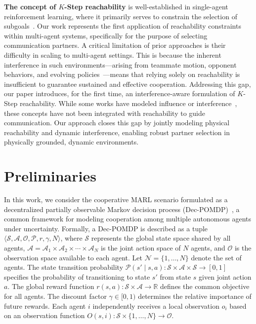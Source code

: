 \documentclass[10pt]{article} %
\begin{document}
\textbf{The concept of $K$-Step reachability} is well-established in single-agent reinforcement learning, where it primarily serves to constrain the selection of subgoals~\cite{nachum2018data, vezhnevets2017feudal}. Our work represents the first application of reachability constraints within multi-agent systems, specifically for the purpose of selecting communication partners. A critical limitation of prior approaches is their difficulty in scaling to multi-agent settings. This is because the inherent interference in such environments—arising from teammate motion, opponent behaviors, and evolving policies~\cite{lowe2017multi}—means that relying solely on reachability is insufficient to guarantee sustained and effective cooperation. Addressing this gap, our paper introduces, for the first time, an interference-aware formulation of $K$-Step reachability. While some works have modeled influence or interference~\cite{jiang2020Graph, omidshafiei2022multiagent}, these concepts have not been integrated with reachability to guide communication. Our approach closes this gap by jointly modeling physical reachability and dynamic interference, enabling robust partner selection in physically grounded, dynamic environments.

\section{Preliminaries}
In this work, we consider the cooperative MARL scenario formulated as a decentralized partially observable Markov decision process (Dec-POMDP)~\citep{oliehoek2016concise}, a common framework for modeling cooperation among multiple autonomous agents under uncertainty. Formally, a Dec-POMDP is described as a tuple $\langle \mathcal{S},\mathcal{A},\mathcal{O},\mathcal{P},r,\gamma,N\rangle$, where $\mathcal{S}$ represents the global state space shared by all agents, $\mathcal{A}=\mathcal{A}_{1}\times\mathcal{A}_{2}\times\cdots\times\mathcal{A}_{N}$ is the joint action space of $N$ agents, and $\mathcal{O}$ is the observation space available to each agent. Let $\mathcal{N} = \{1, \dots, N\}$ denote the set of agents. The state transition probability $\mathcal{P}(s'\mid s,a)\colon \mathcal{S}\times\mathcal{A}\times\mathcal{S}\to[0,1]$ specifies the probability of transitioning to state $s'$ from state $s$ given joint action $a$. The global reward function $r(s,a)\colon \mathcal{S}\times\mathcal{A}\to\mathbb{R}$ defines the common objective for all agents. The discount factor $\gamma\in[0,1)$ determines the relative importance of future rewards. Each agent $i$ independently receives a local observation $o_{i}$ based on an observation function $O(s,i)\colon \mathcal{S}\times\{1,\ldots,N\}\to\mathcal{O}$. 
\end{document}
